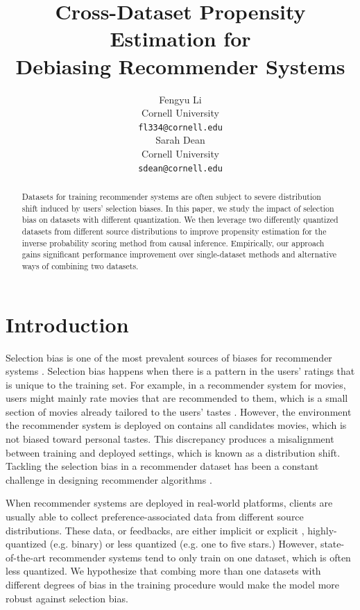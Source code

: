 \documentclass{article}
\title{Cross-Dataset Propensity Estimation for \\Debiasing Recommender Systems}
\author{%
  Fengyu Li \\
  Cornell University\\
  \texttt{fl334@cornell.edu} \\
  \And
  Sarah Dean \\
  Cornell University \\
  \texttt{sdean@cornell.edu} \\
}
\begin{document}
\maketitle


\begin{abstract}
  Datasets for training recommender systems are often subject to severe distribution shift induced by users' selection biases. In this paper, we study the impact of selection bias on datasets with different quantization. We then leverage two differently quantized datasets from different source distributions to improve propensity estimation for the inverse probability scoring method from causal inference. Empirically, our approach gains significant performance improvement over single-dataset methods and alternative ways of combining two datasets. 
\end{abstract}

\section{Introduction}
Selection bias is one of the most prevalent sources of biases for recommender systems \cite{chen2020bias}. Selection bias happens when there is a pattern in the users' ratings that is unique to the training set. For example, in a recommender system for movies, users might mainly rate movies that are recommended to them, which is a small section of movies already tailored to the users' tastes \cite{pradel2012ranking}. However, the environment the recommender system is deployed on contains all candidates movies, which is not biased toward personal tastes. This discrepancy produces a misalignment between training and deployed settings, which is known as a distribution shift. Tackling the selection bias in a recommender dataset has been a constant challenge in designing recommender algorithms \cite{schnabel2016recommendations}.

When recommender systems are deployed in real-world platforms, clients are usually able to collect preference-associated data from different source distributions. These data, or feedbacks, are either implicit or explicit \cite{aggarwal2016recommender}, highly-quantized (e.g. binary) or less quantized (e.g. one to five stars.) However, state-of-the-art recommender systems tend to only train on one dataset, which is often less quantized. We hypothesize that combing more than one datasets with different degrees of bias in the training procedure would make the model more robust against selection bias.
\end{document}
